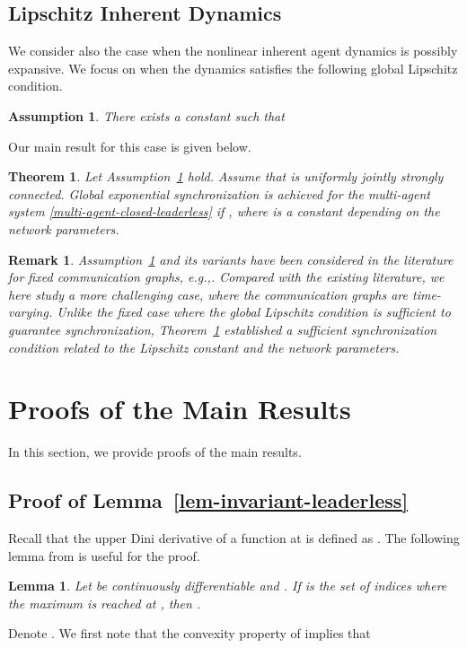\documentclass[a4paper, 11pt]{article}
\newtheorem{theorem}{Theorem}
\newtheorem{assumption}{Assumption}
\newtheorem{lemma}{Lemma}
\newtheorem{remark}{Remark}
\begin{document}
\subsection{Lipschitz Inherent Dynamics}\label{sec-unstable}
We consider also the case when the nonlinear inherent agent dynamics is possibly expansive.
We focus on when the dynamics satisfies
the following global Lipschitz condition.

\begin{assumption}\label{ass-phi-state-1}
There exists a constant  such that

\end{assumption}

Our  main result for this case is given below.

\begin{theorem}\label{unstable-thm1}
Let Assumption~\ref{ass-phi-state-1} hold.
Assume that  is uniformly jointly strongly connected.
Global exponential synchronization is achieved for the
multi-agent system \eqref{multi-agent-closed-leaderless}
if , where  is a constant depending on the network parameters.
\end{theorem}

\begin{remark}\label{remark-unstable-ass}
Assumption~\ref{ass-phi-state-1} and its variants have been considered in the literature for fixed communication
graphs, e.g.,\cite{wu-chua,wu-book,belykh-belykh-hasler,delellis-circuit,liu-cao-wu,yu-chen-cao-tac2011,munz3}.
Compared with the existing literature, we here study a more challenging case, where the communication graphs are time-varying.
Unlike the fixed case where the global Lipschitz condition is sufficient to guarantee synchronization,
Theorem~\ref{unstable-thm1} established a sufficient synchronization condition related to the Lipschitz constant and the network parameters.
\end{remark}



\section{Proofs of the Main Results}\label{sec-proofs}
In this section, we provide proofs of the main results.
\subsection{Proof of Lemma~\ref{lem-invariant-leaderless}}\label{proof-lem-invariant-leaderless}
Recall that the upper Dini derivative of a function  at  is defined as . The following lemma from \cite{dan,lin07} is useful for the proof.
\begin{lemma}\label{lem1}
Let  be
continuously differentiable and . If 
is the set of indices where the maximum is reached at , then .
\end{lemma}
Denote .
We first note that the convexity property of  implies that \cite[pp.69]{boyd-vandenberghe}
\end{document}
